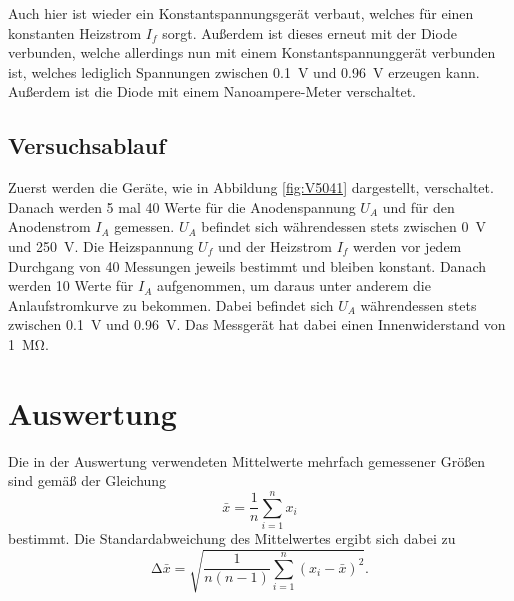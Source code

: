 \documentclass[
  bibliography=totoc,     %
  captions=tableheading,  %
  titlepage=firstiscover, %
]{scrartcl}
\begin{document}
\noindent
Auch hier ist wieder ein Konstantspannungsgerät verbaut, welches für einen konstanten Heizstrom $I_f$ sorgt. Außerdem ist dieses erneut mit der Diode verbunden, welche allerdings nun mit einem Konstantspannunggerät verbunden ist, welches lediglich Spannungen zwischen \SI{0.1}{\volt} und \SI{0.96}{\volt} erzeugen kann. Außerdem ist die Diode mit einem Nanoampere-Meter verschaltet.
\subsection{Versuchsablauf}
\label{sec:ablauf}
Zuerst werden die Geräte, wie in Abbildung \ref{fig:V5041} dargestellt, verschaltet. Danach werden 5 mal 40 Werte für die Anodenspannung $U_A$ und für den Anodenstrom $I_A$ gemessen. $U_A$ befindet sich währendessen stets zwischen \SI{0}{\volt} und \SI{250}{\volt}. Die Heizspannung $U_f$ und der Heizstrom $I_f$ werden vor jedem Durchgang von 40 Messungen jeweils bestimmt und bleiben konstant. Danach werden 10 Werte für $I_A$ aufgenommen, um daraus unter anderem die Anlaufstromkurve zu bekommen. Dabei befindet sich $U_A$ währendessen stets zwischen \SI{0.1}{\volt} und \SI{0.96}{\volt}. Das Messgerät hat dabei einen Innenwiderstand von \SI{1}{\mega\ohm}.
\clearpage
\section{Auswertung}
\label{sec:auswertung}
Die in der Auswertung verwendeten Mittelwerte mehrfach gemessener Größen sind gemäß der
Gleichung
\begin{equation}
    \bar{x}=\frac{1}{n}\sum_{i=1}^n x_i
    \label{eq:mittelwert}
\end{equation}
bestimmt. Die Standardabweichung des Mittelwertes ergibt sich dabei zu
\begin{equation}
    \mathup{\Delta}\bar{x}=\sqrt{\frac{1}{n(n-1)}\sum_{i=1}^n\left(x_i-\bar{x}\right)^2}.
    \label{eq:standardabweichung}
\end{equation}
\end{document}
